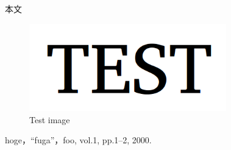 \documentclass{ujarticle}
\begin{document}
\makeatletter
本文

\begin{figure}[tbh]
 \centering
  \includegraphics[height=38mm]{test.png}
  \vspace*{-4mm}
  \caption{Test image}
  \label{fig: fig1}
\end{figure}

\begin{thebibliography}{99}

hoge，``fuga''，foo, vol.1, pp.1--2, 2000.


\end{thebibliography}

\normalsize
\end{document}
